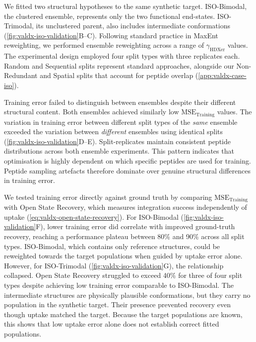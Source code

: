 We fitted two structural hypotheses to the same synthetic target. ISO-Bimodal, the clustered ensemble, represents only the two functional end-states. ISO-Trimodal, its unclustered parent, also includes intermediate conformations (\cref{fig:valdx-iso-validation}B--C). Following standard practice in MaxEnt reweighting, we performed ensemble reweighting across a range of $\gamma_\text{HDXer}$ values.\supercite{hummerBayesianEnsembleRefinement2015,kofingerEfficientEnsembleRefinement2019,cesariUsingMaximumEntropy2018,leeInterpretingHydrogenDeuteriumExchange2021,kihnModelingNativeEnsemble2021} The experimental design employed four split types with three replicates each. Random and Sequential splits represent standard approaches, alongside our Non-Redundant and Spatial splits that account for peptide overlap (\cref{app:valdx-case-iso}).

Training error failed to distinguish between ensembles despite their different structural content. Both ensembles achieved similarly low $\text{MSE}_\text{Training}$ values. The variation in training error between different split types of the \textit{same} ensemble exceeded the variation between \textit{different} ensembles using identical splits (\cref{fig:valdx-iso-validation}D--E). Split-replicates maintain consistent peptide distributions across both ensemble experiments. This pattern indicates that optimisation is highly dependent on which specific peptides are used for training. Peptide sampling artefacts therefore dominate over genuine structural differences in training error.

We tested training error directly against ground truth by comparing $\text{MSE}_\text{Training}$ with Open State Recovery, which measures integration success independently of uptake (\cref{eq:valdx-open-state-recovery}). For ISO-Bimodal (\cref{fig:valdx-iso-validation}F), lower training error did correlate with improved ground-truth recovery, reaching a performance plateau between 80\% and 90\% across all split types. ISO-Bimodal, which contains only reference structures, could be reweighted towards the target populations when guided by uptake error alone. However, for ISO-Trimodal (\cref{fig:valdx-iso-validation}G), the relationship collapsed. Open State Recovery struggled to exceed 40\% for three of four split types despite achieving low training error comparable to ISO-Bimodal. The intermediate structures are physically plausible conformations, but they carry no population in the synthetic target. Their presence prevented recovery even though uptake matched the target. Because the target populations are known, this shows that low uptake error alone does not establish correct fitted populations.

